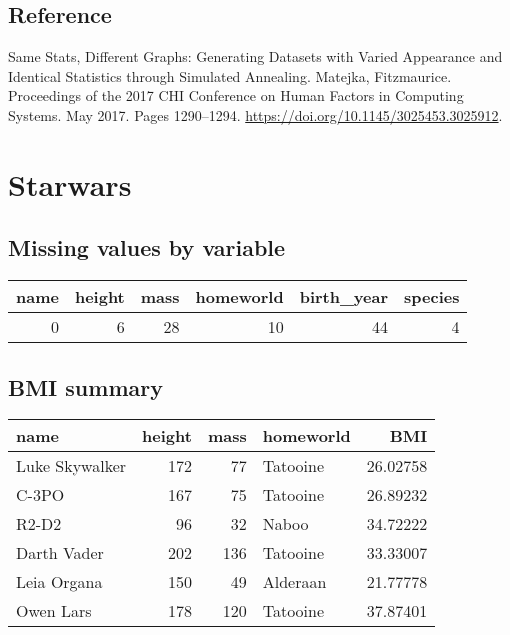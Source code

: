 \documentclass[
]{book}
\begin{document}
\hypertarget{reference}{%
\subsection{Reference}\label{reference}}

Same Stats, Different Graphs: Generating Datasets with Varied Appearance and Identical Statistics through Simulated Annealing. Matejka, Fitzmaurice. Proceedings of the 2017 CHI Conference on Human Factors in Computing Systems. May 2017. Pages 1290--1294. \url{https://doi.org/10.1145/3025453.3025912}.

\hypertarget{starwars-1}{%
\section{Starwars}\label{starwars-1}}

\hypertarget{missing-values-by-variable}{%
\subsection{Missing values by variable}\label{missing-values-by-variable}}

\begin{tabular}{r|r|r|r|r|r}
\hline
name & height & mass & homeworld & birth\_year & species\\
\hline
0 & 6 & 28 & 10 & 44 & 4\\
\hline
\end{tabular}

\hypertarget{bmi-summary}{%
\subsection{BMI summary}\label{bmi-summary}}

\begin{tabular}{l|r|r|l|r}
\hline
name & height & mass & homeworld & BMI\\
\hline
Luke Skywalker & 172 & 77 & Tatooine & 26.02758\\
\hline
C-3PO & 167 & 75 & Tatooine & 26.89232\\
\hline
R2-D2 & 96 & 32 & Naboo & 34.72222\\
\hline
Darth Vader & 202 & 136 & Tatooine & 33.33007\\
\hline
Leia Organa & 150 & 49 & Alderaan & 21.77778\\
\hline
Owen Lars & 178 & 120 & Tatooine & 37.87401\\
\hline
\end{tabular}
\end{document}
